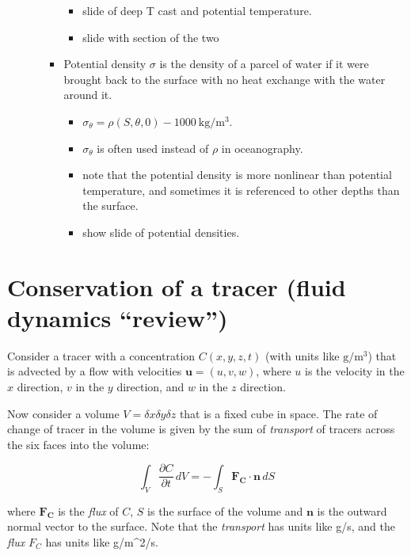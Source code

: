 \begin{itemize}
\begin{itemize}
\begin{itemize}
      \begin{itemize}
      \tightlist
      \item
        slide of deep T cast and potential temperature.
      \item
        slide with section of the two
      \end{itemize}
    \item
      Potential density \(\sigma\) is the density of a parcel of water
      if it were brought back to the surface with no heat exchange with
      the water around it.

      \begin{itemize}
      \tightlist
      \item
        \(\sigma_{\theta} = \rho(S, \theta, 0) - 1000\ \mathrm{kg/m^3}\).
      \item
        \(\sigma_{\theta}\) is often used instead of \(\rho\) in
        oceanography.
      \item
        note that the potential density is more nonlinear than potential
        temperature, and sometimes it is referenced to other depths than
        the surface.
      \item
        show slide of potential densities.
      \end{itemize}
    \end{itemize}
  \end{itemize}
\end{itemize}

\section{Conservation of a tracer (fluid dynamics
``review'')}\label{conservation-of-a-tracer-fluid-dynamics-review}

Consider a tracer with a concentration \(C(x,y,z,t)\) (with units like
\(\mathrm{g/m^3}\)) that is advected by a flow with velocities
\(\mathbf{u} = (u,v,w)\), where \(u\) is the velocity in the \(x\)
direction, \(v\) in the \(y\) direction, and \(w\) in the \(z\)
direction.

Now consider a volume \(V = \delta x \delta y \delta z\) that is a fixed
cube in space. The rate of change of tracer in the volume is given by
the sum of \emph{transport} of tracers across the six faces into the
volume:

\[ \int_V \frac{\partial C}{\partial t}  \, dV = -\int_S \mathbf{F_C} \cdot \mathbf{n} \, dS\]

where \(\mathbf{F_C}\) is the \emph{flux} of \(C\), \(S\) is the surface
of the volume and \(\mathbf{n}\) is the outward normal vector to the
surface. Note that the \emph{transport} has units like g/s, and the
\emph{flux} \(F_C\) has units like g/m\^{}2/s.

